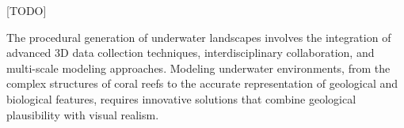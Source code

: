 [TODO]



The procedural generation of underwater landscapes involves the integration of advanced 3D data collection techniques, interdisciplinary collaboration, and multi-scale modeling approaches. Modeling underwater environments, from the complex structures of coral reefs to the accurate representation of geological and biological features, requires innovative solutions that combine geological plausibility with visual realism.



